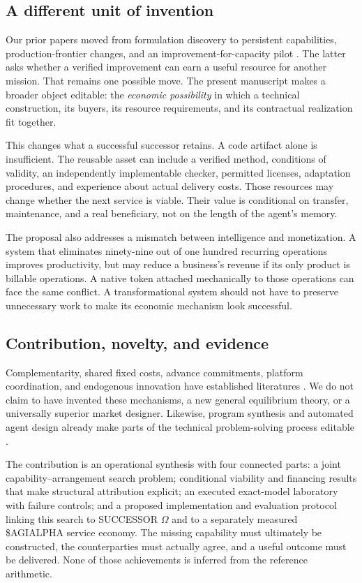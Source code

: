 \documentclass[11pt,letterpaper]{article}
\theoremstyle{remark}\newtheorem{remark}{Remark}[section]
\begin{document}
\subsection{A different unit of invention}
Our prior papers moved from formulation discovery to persistent capabilities, production-frontier changes, and an improvement-for-capacity pilot \citep{boucherTI,boucherOriginal,boucherProduction,boucherEarn}. The latter asks whether a verified improvement can earn a useful resource for another mission. That remains one possible move. The present manuscript makes a broader object editable: the \emph{economic possibility} in which a technical construction, its buyers, its resource requirements, and its contractual realization fit together.

This changes what a successful successor retains. A code artifact alone is insufficient. The reusable asset can include a verified method, conditions of validity, an independently implementable checker, permitted licenses, adaptation procedures, and experience about actual delivery costs. Those resources may change whether the next service is viable. Their value is conditional on transfer, maintenance, and a real beneficiary, not on the length of the agent's memory.

The proposal also addresses a mismatch between intelligence and monetization. A system that eliminates ninety-nine out of one hundred recurring operations improves productivity, but may reduce a business's revenue if its only product is billable operations. A native token attached mechanically to those operations can face the same conflict. A transformational system should not have to preserve unnecessary work to make its economic mechanism look successful.

\subsection{Contribution, novelty, and evidence}
Complementarity, shared fixed costs, advance commitments, platform coordination, and endogenous innovation have established literatures \citep{milgrom1990,kremer2020,rochet2003,romer1990}. We do not claim to have invented these mechanisms, a new general equilibrium theory, or a universally superior market designer. Likewise, program synthesis and automated agent design already make parts of the technical problem-solving process editable \citep{ellis2020,hu2024,novikov2025}.

The contribution is an operational synthesis with four connected parts: a joint capability--arrangement search problem; conditional viability and financing results that make structural attribution explicit; an executed exact-model laboratory with failure controls; and a proposed implementation and evaluation protocol linking this search to SUCCESSOR $\Omega$ and to a separately measured \$AGIALPHA service economy. The missing capability must ultimately be constructed, the counterparties must actually agree, and a useful outcome must be delivered. None of those achievements is inferred from the reference arithmetic.
\end{document}

